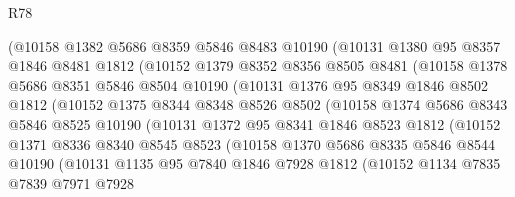 \begin{lexlean}{R78}
\begin{coremodule}
              (@10158
                @1382
                @5686
                @8359
                @5846
                @8483
                @10190
                (@10131
                  @1380
                  @95
                  @8357
                  @1846
                  @8481
                  @1812
                  (@10152
                    @1379
                    @8352
                    @8356
                    @8505
                    @8481
                    (@10158
                      @1378
                      @5686
                      @8351
                      @5846
                      @8504
                      @10190
                      (@10131
                        @1376
                        @95
                        @8349
                        @1846
                        @8502
                        @1812
                        (@10152
                          @1375
                          @8344
                          @8348
                          @8526
                          @8502
                          (@10158
                            @1374
                            @5686
                            @8343
                            @5846
                            @8525
                            @10190
                            (@10131
                              @1372
                              @95
                              @8341
                              @1846
                              @8523
                              @1812
                              (@10152
                                @1371
                                @8336
                                @8340
                                @8545
                                @8523
                                (@10158
                                  @1370
                                  @5686
                                  @8335
                                  @5846
                                  @8544
                                  @10190
                                  (@10131
                                    @1135
                                    @95
                                    @7840
                                    @1846
                                    @7928
                                    @1812
                                    (@10152
                                      @1134
                                      @7835
                                      @7839
                                      @7971
                                      @7928

\end{coremodule}
\end{lexlean}
